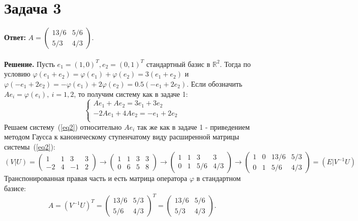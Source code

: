 \documentclass{article}
\begin{document}
\section*{Задача 3}
{\bf Ответ:} $A=\left(\begin{array}{rr}13/6 & 5/6\\5/3 & 4/3\end{array}\right)$.
\\
\\
{\bf Решение.} Пусть $e_1=(1,0)^T, e_2=(0,1)^T$ стандартный базис в $\mathbb{R}^2$. Тогда по условию $\varphi(e_1+e_2)=\varphi(e_1)+\varphi(e_2)=3(e_1+e_2)$ и $\varphi(-e_1+2e_2)=-\varphi(e_1)+2\varphi(e_2)=0.5(-e_1+2e_2)$. Если обозначить $Ae_i=\varphi(e_i),\ i=1,2$, то получим систему как в задаче 1:
\begin{equation}
\label{eq2}
    \begin{cases}
    Ae_1+Ae_2 = 3e_1 + 3e_2\\
    -2Ae_1+4Ae_2 = -e_1 + 2e_2\\
    \end{cases}
\end{equation}
Решаем систему~(\ref{eq2}) относительно $Ae_i$ так же как в задаче 1 - приведением методом Гаусса к каноническому ступенчатому виду расширенной матрицы системы~(\ref{eq2}):
$$(V|U)=\left(\begin{array}{rr|rr}1 & 1 & 3 & 3\\-2 & 4 &-1 & 2\end{array}\right)\rightarrow\left(\begin{array}{rr|rr}1 & 1 & 3 & 3\\0 & 6 & 5 & 8\end{array}\right)\rightarrow\left(\begin{array}{rr|rr}1 & 1 & 3 & 3\\0 & 1 & 5/6 & 4/3\end{array}\right)\rightarrow\left(\begin{array}{rr|rr}1 & 0 & 13/6 & 5/3\\0 & 1 & 5/6 & 4/3\end{array}\right)=(E|V^{-1}U)$$
Транспонированная правая часть и есть матрица оператора $\varphi$ в стандартном базисе: 
$$A=(V^{-1}U)^T=\left(\begin{array}{rr}13/6 & 5/3\\5/6 & 4/3\end{array}\right)^T=\left(\begin{array}{rr}13/6 & 5/6\\5/3 & 4/3\end{array}\right).$$
\end{document}
